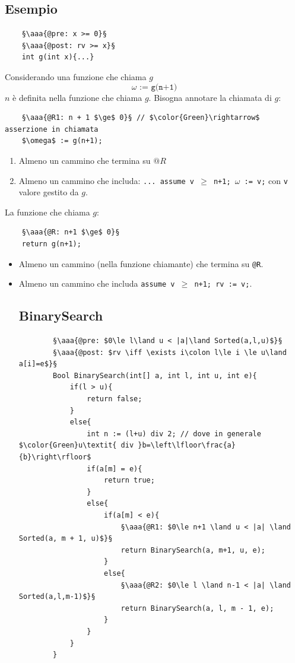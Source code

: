 \subsection{Esempio}
\begin{lstlisting}
	§\aaa{@pre: x >= 0}§
	§\aaa{@post: rv >= x}§
	int g(int x){...}
\end{lstlisting}
Considerando una funzione che chiama $g$ $$\texttt{$\omega$ := g(n+1)}$$
$n$ è definita nella funzione che chiama $g$. Bisogna annotare la chiamata di $g$:
\begin{lstlisting}
	§\aaa{@R1: n + 1 $\ge$ 0}§ // $\color{Green}\rightarrow$ asserzione in chiamata
	$\omega$ := g(n+1);
\end{lstlisting}
\begin{enumerate}
	\item Almeno un cammino che termina su $@R$
	\item Almeno un cammino che includa: \texttt{... assume v $\ge$ n+1; $\omega$ := v;} con \texttt{v} valore gestito da $g$.
\end{enumerate}
La funzione che chiama $g$:
\begin{lstlisting}
	§\aaa{@R: n+1 $\ge$ 0}§
	return g(n+1);
\end{lstlisting}
\begin{itemize}
	\item Almeno un cammino (nella funzione chiamante) che termina su \texttt{@R}.
	\item Almeno un cammino che includa \texttt{assume v $\ge$ n+1; rv := v;}.
	\subsection{BinarySearch}
	\begin{lstlisting}
		§\aaa{@pre: $0\le l\land u < |a|\land Sorted(a,l,u)$}§
		§\aaa{@post: $rv \iff \exists i\colon l\le i \le u\land a[i]=e$}§
		Bool BinarySearch(int[] a, int l, int u, int e){
			if(l > u){
				return false;
			}
			else{
				int n := (l+u) div 2; // dove in generale $\color{Green}u\textit{ div }b=\left\lfloor\frac{a}{b}\right\rfloor$
				if(a[m] = e){
					return true;
				}
				else{
					if(a[m] < e){
						§\aaa{@R1: $0\le n+1 \land u < |a| \land Sorted(a, m + 1, u)$}§
						return BinarySearch(a, m+1, u, e);
					}
					else{
						§\aaa{@R2: $0\le l \land n-1 < |a| \land Sorted(a,l,m-1)$}§
						return BinarySearch(a, l, m - 1, e);
					}
				}
			}
		}
	\end{lstlisting}
\end{itemize}
